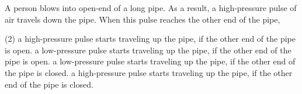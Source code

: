 
\item A person blows into open-end of a long pipe. As a result, a high-pressure pulse of air travels down the pipe. When this pulse reaches the other end of the pipe,
    \begin{tasks}(2)
        \task a high-pressure pulse starts traveling up the pipe, if the other end of the pipe is open.
        \task a low-pressure pulse starts traveling up the pipe, if the other end of the pipe is open.
        \task a low-pressure pulse starts traveling up the pipe, if the other end of the pipe is closed.
        \task a high-pressure pulse starts traveling up the pipe, if the other end of the pipe is closed.
    \end{tasks}
